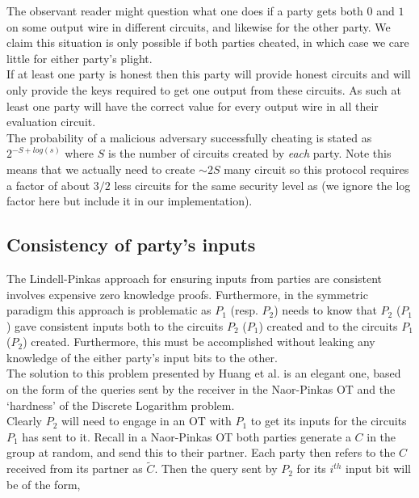 \documentclass[ %
                    author={Nicholas Tutte},
                supervisor={Prof. Nigel Smart},
                    degree={MEng},
                     title={Secure Two Party Computation},
                  subtitle={A practical comparison of recent protocols},
                      type={Research - GG1K},
                      year={2015} ]{dissertation}
\begin{document}
				The observant reader might question what one does if a party gets both $0$ and $1$ on some output wire in different circuits, and likewise for the other party. We claim this situation is only possible if both parties cheated, in which case we care little for either party's plight.\\

				If at least one party is honest then this party will provide honest circuits and will only provide the keys required to get one output from these circuits. As such at least one party will have the correct value for every output wire in all their evaluation circuit.\\

				The probability of a malicious adversary successfully cheating is stated as $2^{-S + log(s)}$ where $S$ is the number of circuits created by \emph{each} party. Note this means that we actually need to create $\sim 2S$ many circuit so this protocol requires a factor of about $3/2$ less circuits for the same security level as \cite{LindellAndPinkas2011} (we ignore the log factor here but include it in our implementation).
				
			\subsection{Consistency of party's inputs} \label{sub:HKE_Consistency}
				The Lindell-Pinkas approach for ensuring inputs from parties are consistent involves expensive zero knowledge proofs. Furthermore, in the symmetric paradigm this approach is problematic as $P_1$ (resp. $P_2$) needs to know that $P_2$ ($P_1$) gave consistent inputs both to the circuits $P_2$ ($P_1$) created and to the circuits $P_1$ ($P_2$) created. Furthermore, this must be accomplished without leaking any knowledge of the either party's input bits to the other.\\

				The solution to this problem presented by Huang et al. is an elegant one, based on the form of the queries sent by the receiver in the Naor-Pinkas OT and the `hardness' of the Discrete Logarithm problem.\\

				Clearly $P_2$ will need to engage in an OT with $P_1$ to get its inputs for the circuits $P_1$ has sent to it. Recall in a Naor-Pinkas OT both parties generate a $C$ in the group at random, and send this to their partner. Each party then refers to the $C$ received from its partner as $\tilde C$. Then the query sent by $P_2$ for its $i^{th}$ input bit will be of the form,
\end{document}
